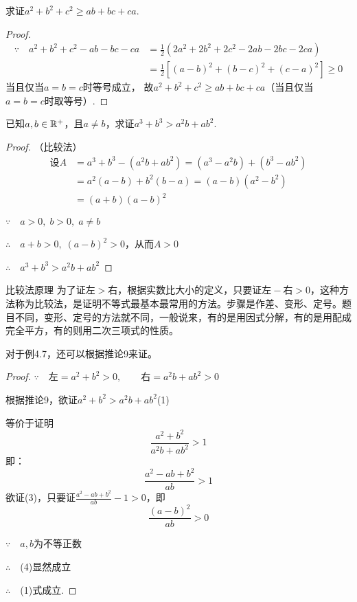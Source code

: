 \begin{example}
    求证$a^2+b^2+c^2\ge ab+bc+ca$.
\end{example}

\begin{proof}
\[\begin{split}
  \because\quad  a^2+b^2+c^2-ab-bc-ca  &=\frac{1}{2}(2a^2+2b^2+2c^2-2ab-2bc-2ca)\\
  &=\frac{1}{2}[(a-b)^2+(b-c)^2+(c-a)^2]\ge 0
\end{split}\]
当且仅当$a=b=c$时等号成立，
故$a^2+b^2+c^2\ge ab+bc+ca$（当且仅当$a=b=c$时取等号）.
\end{proof}

\begin{example}
    已知$a,b\in\mathbb{R}^+$，且$a\ne b$，求证$a^3+b^3>a^2b+ab^2$.
\end{example}

\begin{proof}
    （比较法）
\[\begin{split}
    \text{设}A&=a^3+b^3-(a^2b+ab^2)=(a^3-a^2b)+(b^3-ab^2)\\
    &=a^2(a-b)+b^2(b-a)=(a-b)(a^2-b^2)\\
    &=(a+b)(a-b)^2
\end{split}\]

$\because\quad a>0,\; b>0,\; a\ne b$

$\therefore\quad a+b>0,\; (a-b)^2>0$，从而$A>0$

$\therefore\quad a^3+b^3>a^2b+ab^2$
\end{proof}

\begin{thm}{比较法原理}
     为了证左$>$右，根据实数比大小的定义，只要证$\text{左}-\text{右}>0$，这种方法称为比较法，是证明不等式最基本最常用的方法。步骤是作差、变形、定号。题目不同，变形、定号的方法就不同，一般说来，有的是用因式分解，有的是用配成完全平方，有的则用二次三项式的性质。
\end{thm}

对于例4.7，还可以根据推论9来证。

\begin{proof}
$\because\quad \text{左}=a^2+b^2>0,\qquad \text{右}=a^2b+ab^2>0$

根据推论9，欲证$a^2+b^2>a^2b+ab^2$\hfill (1)

等价于证明
\begin{equation}
    \frac{a^2+b^2}{a^2b+ab^2}>1 \tag{2}
\end{equation}
即：
\begin{equation}
    \frac{a^2-ab+b^2}{ab}>1 \tag{3}
\end{equation}
欲证(3)，只要证$\frac{a^2-ab+b^2}{ab}-1>0$，即
\begin{equation}
    \frac{(a-b)^2}{ab}>0 \tag{4}
\end{equation}

$\because\quad a,b$为不等正数

$\therefore\quad $(4)显然成立

$\therefore\quad $(1)式成立.

\end{proof}

